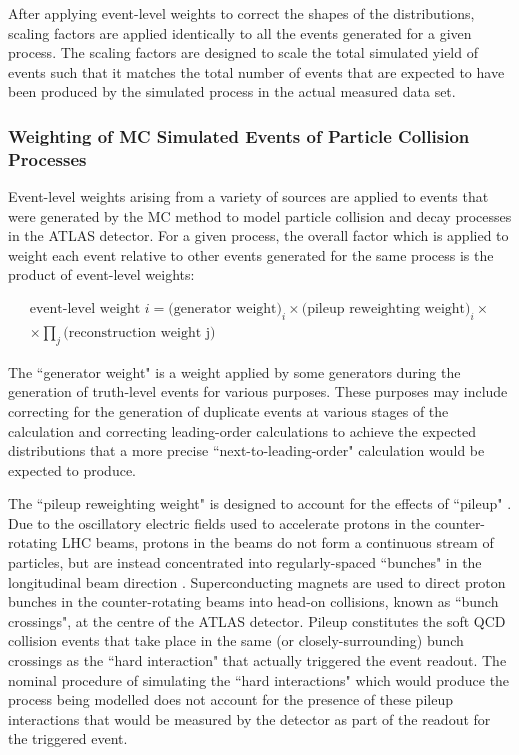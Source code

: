 After applying event-level weights to correct the shapes of the distributions, scaling factors are applied identically to all the events generated for a given process. The scaling factors are designed to scale the total simulated yield of events such that it matches the total number of events that are expected to have been produced by the simulated process in the actual measured data set. 


\subsubsection{Weighting of MC Simulated Events of Particle Collision Processes}
\label{sec:evt_wts}

Event-level weights arising from a variety of sources are applied to events that were generated by the MC method to model particle collision and decay processes in the ATLAS detector. For a given process, the overall factor which is applied to weight each event relative to other events generated for the same process is the product of event-level weights:

\begin{multline}
\label{eq:evt_wt}
\text{event-level weight }i = \text{(generator weight)}_i \times \text{(pileup reweighting weight)}_i \times \\ \times \prod_j \text{(reconstruction weight j)}
\end{multline}

The ``generator weight" is a weight applied by some generators during the generation of truth-level events for various purposes. These purposes may include correcting for the generation of duplicate events at various stages of the calculation and correcting leading-order calculations to achieve the expected distributions that a more precise ``next-to-leading-order" calculation would be expected to produce. 

The ``pileup reweighting weight" is designed to account for the effects of ``pileup" \cite{pileup}. Due to the oscillatory electric fields used to accelerate protons in the counter-rotating LHC beams, protons in the beams do not form a continuous stream of particles, but are instead concentrated into regularly-spaced ``bunches" in the longitudinal beam direction \cite{acc_physics_text}. Superconducting magnets are used to direct proton bunches in the counter-rotating beams into head-on collisions, known as ``bunch crossings", at the centre of the ATLAS detector. Pileup constitutes the soft QCD collision events that take place in the same (or closely-surrounding) bunch crossings as the ``hard interaction" that actually triggered the event readout. The nominal procedure of simulating the ``hard interactions" which would produce the process being modelled does not account for the presence of these pileup interactions that would be measured by the detector as part of the readout for the triggered event. 

